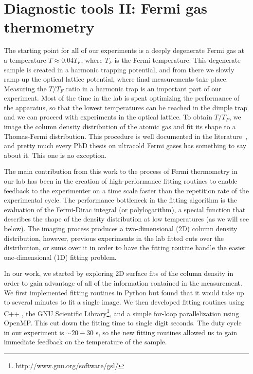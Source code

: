 \chapter{Diagnostic tools II: Fermi gas thermometry}
\label{chap:fermi-thermometry}


The starting point for all of our experiments is a deeply degenerate Fermi gas
at a temperature $T\approx 0.04 T_{F}$, where $T_{F}$ is the Fermi temperature.
This degenerate sample is created in a harmonic trapping potential, and from
there we slowly ramp up the optical lattice potential, where final measurements
take place.  Measuring the $T/T_{F}$ ratio in a harmonic trap is an important
part of our experiment.  Most of the time in the lab is spent optimizing the
performance of the apparatus, so that the lowest temperatures can be reached in
the dimple trap and we can proceed with experiments in the optical lattice.  To
obtain $T/T_{F}$, we image the column density distribution of the atomic gas
and fit its shape to a Thomas-Fermi distribution.   This procedure is well
documented in the literature~\cite{Making2007}, and pretty much every PhD
thesis on ultracold Fermi gases has something to say about it. This one is no
exception.   

The main contribution from this work to the process of Fermi thermometry in our
lab has been in the creation of high-performance fitting routines to enable
feedback to the experimenter on a time scale faster than the repetition rate of
the experimental cycle.  The performance bottleneck in the fitting algorithm is
the evaluation of the Fermi-Dirac integral (or polylogarithm),  a special
function that describes the shape of the density distribution at low
temperatures (as we will see below).  The imaging process produces a
two-dimensional (2D) column density distribution, however, previous experiments
in the lab fitted cuts over the distribution, or sums over it in order to
have the fitting routine handle the easier one-dimensional (1D) fitting
problem.  

In our work, we started by exploring 2D surface fits of the column density in
order to gain advantage of all of the information contained in the measurement.
We first implemented fitting routines in Python but found that it would take up
to several minutes to fit a single image.    We then developed fitting routines
using C++ , the GNU Scientific
Library\footnote{http://www.gnu.org/software/gsl/}, and a simple for-loop
parallelization using OpenMP.  This cut down the fitting time to single digit
seconds.   The duty cycle in our experiment is $\sim20-30$ s, so
the new fitting routines allowed us to gain immediate feedback on the
temperature of the sample.

